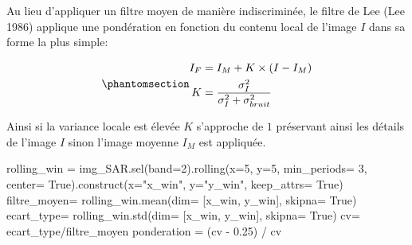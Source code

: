 \documentclass[
  11pt,
  letterpaper,
  open=any,
  twoside=false,
  french]{scrbook}
\newenvironment{Shaded}{\begin{snugshade}}{\end{snugshade}}
\newcommand{\DecValTok}[1]{\textcolor[rgb]{0.68,0.00,0.00}{#1}}
\newcommand{\FloatTok}[1]{\textcolor[rgb]{0.68,0.00,0.00}{#1}}
\newcommand{\NormalTok}[1]{\textcolor[rgb]{0.00,0.23,0.31}{#1}}
\newcommand{\OperatorTok}[1]{\textcolor[rgb]{0.37,0.37,0.37}{#1}}
\newcommand{\StringTok}[1]{\textcolor[rgb]{0.13,0.47,0.30}{#1}}
\newcommand{\VariableTok}[1]{\textcolor[rgb]{0.07,0.07,0.07}{#1}}
\begin{document}
Au lieu d'appliquer un filtre moyen de manière indiscriminée, le filtre
de Lee (Lee 1986) applique une pondération en fonction du contenu local
de l'image \(I\) dans sa forme la plus simple:

\begin{equation}\phantomsection\label{eq-lee-filter}{ 
\begin{aligned}
I_F & = I_M + K \times (I - I_M) \\
K & = \frac{\sigma^2_I}{\sigma^2_I + \sigma^2_{bruit}}
\end{aligned}
}\end{equation}

Ainsi si la variance locale est élevée \(K\) s'approche de \(1\)
préservant ainsi les détails de l'image \(I\) sinon l'image moyenne
\(I_M\) est appliquée.

\begin{Shaded}
\begin{Highlighting}[]
\NormalTok{rolling\_win }\OperatorTok{=}\NormalTok{ img\_SAR.sel(band}\OperatorTok{=}\DecValTok{2}\NormalTok{).rolling(x}\OperatorTok{=}\DecValTok{5}\NormalTok{, y}\OperatorTok{=}\DecValTok{5}\NormalTok{,  min\_periods}\OperatorTok{=} \DecValTok{3}\NormalTok{, center}\OperatorTok{=} \VariableTok{True}\NormalTok{).construct(x}\OperatorTok{=}\StringTok{"x\_win"}\NormalTok{, y}\OperatorTok{=}\StringTok{"y\_win"}\NormalTok{, keep\_attrs}\OperatorTok{=} \VariableTok{True}\NormalTok{)}
\NormalTok{filtre\_moyen}\OperatorTok{=}\NormalTok{ rolling\_win.mean(dim}\OperatorTok{=}\NormalTok{ [}\StringTok{\textquotesingle{}x\_win\textquotesingle{}}\NormalTok{, }\StringTok{\textquotesingle{}y\_win\textquotesingle{}}\NormalTok{], skipna}\OperatorTok{=} \VariableTok{True}\NormalTok{)}
\NormalTok{ecart\_type}\OperatorTok{=}\NormalTok{ rolling\_win.std(dim}\OperatorTok{=}\NormalTok{ [}\StringTok{\textquotesingle{}x\_win\textquotesingle{}}\NormalTok{, }\StringTok{\textquotesingle{}y\_win\textquotesingle{}}\NormalTok{], skipna}\OperatorTok{=} \VariableTok{True}\NormalTok{)}
\NormalTok{cv}\OperatorTok{=}\NormalTok{ ecart\_type}\OperatorTok{/}\NormalTok{filtre\_moyen}
\NormalTok{ponderation }\OperatorTok{=}\NormalTok{ (cv }\OperatorTok{{-}} \FloatTok{0.25}\NormalTok{) }\OperatorTok{/}\NormalTok{ cv}


\end{Highlighting}
\end{Shaded}
\end{document}
